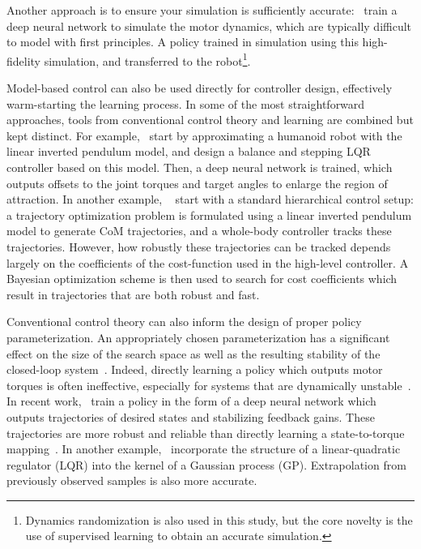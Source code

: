 Another approach is to ensure your simulation is sufficiently accurate:~\textcite{hwangbo2019learning} train a deep neural network to simulate the motor dynamics, which are typically difficult to model with first principles. A policy trained in simulation using this high-fidelity simulation, and transferred to the robot\footnote{Dynamics randomization is also used in this study, but the core novelty is the use of supervised learning to obtain an accurate simulation.}. \par
Model-based control can also be used directly for controller design, effectively warm-starting the learning process. In some of the most straightforward approaches, tools from conventional control theory and learning are combined but kept distinct. For example,~\textcite{kumar2018improving} start by approximating a humanoid robot with the linear inverted pendulum model, and design a balance and stepping LQR controller based on this model. Then, a deep neural network is trained, which outputs offsets to the joint torques and target angles to enlarge the region of attraction.
In another example, ~\textcite{yeganegi2019robust} start with a standard hierarchical control setup: a trajectory optimization problem is formulated using a linear inverted pendulum model to generate CoM trajectories, and a whole-body controller tracks these trajectories. However, how robustly these trajectories can be tracked depends largely on the coefficients of the cost-function used in the high-level controller. A Bayesian optimization scheme is then used to search for cost coefficients which result in trajectories that are both robust and fast. \par
Conventional control theory can also inform the design of proper policy parameterization.
An appropriately chosen parameterization has a significant effect on the size of the search space as well as the resulting stability of the closed-loop system~\cite{roberts2011feedback}.
Indeed, directly learning a policy which outputs motor torques is often ineffective, especially for systems that are dynamically unstable~\cite{peng2017learning}.
In recent work,~\textcite{viereck2018learning} train a policy in the form of a deep neural network which outputs trajectories of desired states and stabilizing feedback gains.
These trajectories are more robust and reliable than directly learning a state-to-torque mapping~\cite{viereck2018learning}.
In another example,~\textcite{marco2017design} incorporate the structure of a linear-quadratic regulator (LQR) into the kernel of a Gaussian process (GP). Extrapolation from previously observed samples is also more accurate. \par
